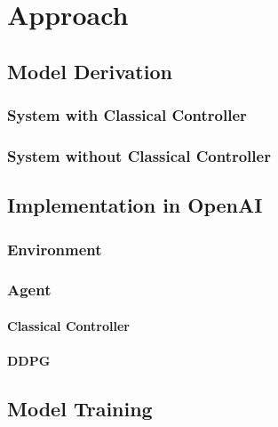\chapter{Approach}


\section{Model Derivation}


\subsection{System with Classical Controller}


\subsection{System without Classical Controller}


\section{Implementation in OpenAI}


\subsection{Environment}


\subsection{Agent}

\subsubsection{Classical Controller}

\subsubsection{DDPG}


\section{Model Training}


